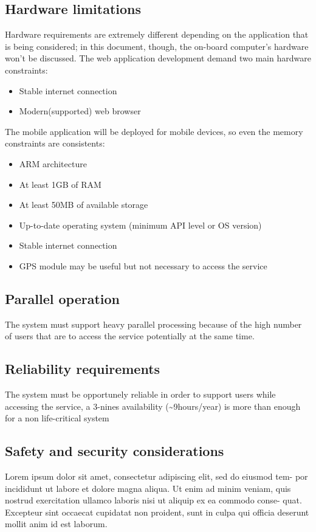 \subsection{Hardware limitations}
\label{subsec: hw_constraints}
Hardware requirements are extremely different depending on the application that is being considered; in this document, though, the on-board computer's hardware won't be discussed.
The web application development demand two main hardware constraints: 
\begin{itemize}
	\item{Stable internet connection}
	\item{Modern(supported) web browser}
\end{itemize}
The mobile application will be deployed for mobile devices, so even the memory constraints are consistents:
\begin{itemize}
	\item{ARM architecture}
	\item{At least 1GB of RAM}
	\item{At least 50MB of available storage}
	\item{Up-to-date operating system (minimum API level or OS version)} 
	\item{Stable internet connection}
	\item{GPS module may be useful but not necessary to access the service}
\end{itemize}
\subsection{Parallel operation}
The system must support heavy parallel processing because of the high number of users that are to access the service potentially at the same time.
\subsection{Reliability requirements}
The system must be opportunely reliable in order to support users while accessing the service, a 3-nines availability (\textasciitilde9hours/year) is more than enough for a non life-critical system 
\subsection{Safety and security considerations}
Lorem ipsum dolor sit amet, consectetur adipiscing elit, sed do eiusmod tem- por incididunt ut labore et dolore magna aliqua. Ut enim ad minim veniam, quis nostrud exercitation ullamco laboris nisi ut aliquip ex ea commodo conse- quat. Excepteur sint occaecat cupidatat non proident, sunt in culpa qui officia deserunt mollit anim id est laborum.
